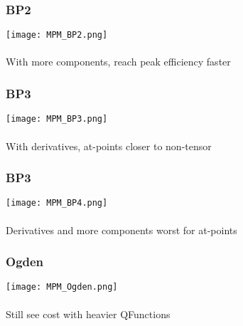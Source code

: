 \documentclass{beamer}
\begin{document}
\begin{frame}
\begin{center}
\frametitle{BP2}

\texttt{[image: MPM\_BP2.png]}\\

~\\

With more components, reach peak efficiency faster

\end{center}
\end{frame}


\begin{frame}
\begin{center}
\frametitle{BP3}

\texttt{[image: MPM\_BP3.png]}\\

~\\

With derivatives, at-points closer to non-tensor

\end{center}
\end{frame}


\begin{frame}
\begin{center}
\frametitle{BP3}

\texttt{[image: MPM\_BP4.png]}\\

~\\

Derivatives and more components worst for at-points

\end{center}
\end{frame}


\begin{frame}
\begin{center}
\frametitle{Ogden}

\texttt{[image: MPM\_Ogden.png]}\\

~\\

Still see cost with heavier QFunctions

\end{center}
\end{frame}
\end{document}
